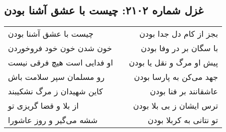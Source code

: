 \begin{center}
\section*{غزل شماره ۲۱۰۲: چیست با عشق آشنا بودن}
\label{sec:2102}
\begin{longtable}{l p{0.5cm} r}
چیست با عشق آشنا بودن
&&
بجز از کام دل جدا بودن
\\
خون شدن خون خود فروخوردن
&&
با سگان بر در وفا بودن
\\
او فدایی است هیچ فرقی نیست
&&
پیش او مرگ و نقل یا بودن
\\
رو مسلمان سپر سلامت باش
&&
جهد می‌کن به پارسا بودن
\\
کاین شهیدان ز مرگ نشکیبند
&&
عاشقانند بر فنا بودن
\\
از بلا و قضا گریزی تو
&&
ترس ایشان ز بی بلا بودن
\\
ششه می‌گیر و روز عاشورا
&&
تو نتانی به کربلا بودن
\\
\end{longtable}
\end{center}
